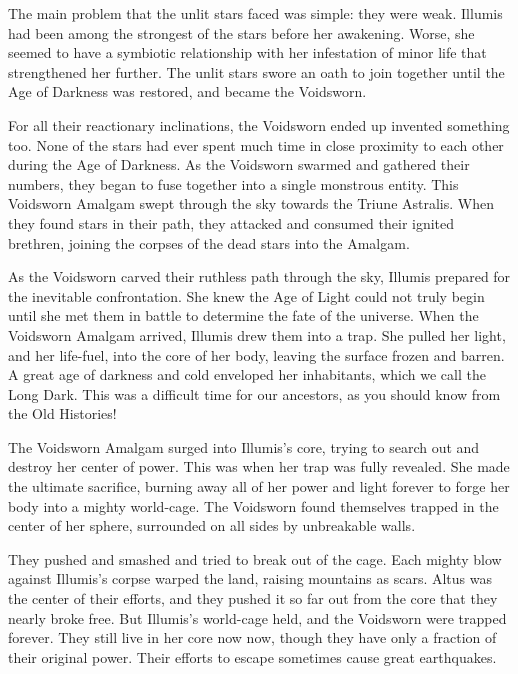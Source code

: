     The main problem that the unlit stars faced was simple: they were weak.
    Illumis had been among the strongest of the stars before her awakening.
    Worse, she seemed to have a symbiotic relationship with her infestation of minor life that strengthened her further.
    The unlit stars swore an oath to join together until the Age of Darkness was restored, and became the Voidsworn.

    For all their reactionary inclinations, the Voidsworn ended up invented something too.
    None of the stars had ever spent much time in close proximity to each other during the Age of Darkness.
    As the Voidsworn swarmed and gathered their numbers, they began to fuse together into a single monstrous entity.
    This Voidsworn Amalgam swept through the sky towards the Triune Astralis.
    When they found stars in their path, they attacked and consumed their ignited brethren, joining the corpses of the dead stars into the Amalgam.

    As the Voidsworn carved their ruthless path through the sky, Illumis prepared for the inevitable confrontation.
    She knew the Age of Light could not truly begin until she met them in battle to determine the fate of the universe.
    When the Voidsworn Amalgam arrived, Illumis drew them into a trap.
    She pulled her light, and her life-fuel, into the core of her body, leaving the surface frozen and barren.
    A great age of darkness and cold enveloped her inhabitants, which we call the Long Dark.
    This was a difficult time for our ancestors, as you should know from the Old Histories!

    The Voidsworn Amalgam surged into Illumis's core, trying to search out and destroy her center of power.
    This was when her trap was fully revealed.
    She made the ultimate sacrifice, burning away all of her power and light forever to forge her body into a mighty world-cage.
    The Voidsworn found themselves trapped in the center of her sphere, surrounded on all sides by unbreakable walls.

    They pushed and smashed and tried to break out of the cage.
    Each mighty blow against Illumis's corpse warped the land, raising mountains as scars.
    Altus was the center of their efforts, and they pushed it so far out from the core that they nearly broke free.
    But Illumis's world-cage held, and the Voidsworn were trapped forever.
    They still live in her core now now, though they have only a fraction of their original power.
    Their efforts to escape sometimes cause great earthquakes.

